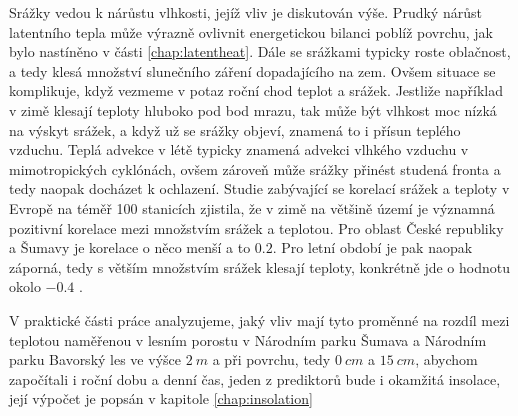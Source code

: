 
Srážky vedou k nárůstu vlhkosti, jejíž vliv je diskutován výše. Prudký nárůst latentního tepla může výrazně ovlivnit energetickou bilanci poblíž povrchu, jak bylo nastíněno v části \ref{chap:latentheat}. Dále se srážkami typicky roste oblačnost, a tedy klesá množství slunečního záření dopadajícího na zem. Ovšem situace se komplikuje, když vezmeme v potaz roční chod teplot a srážek. Jestliže například v zimě klesají teploty hluboko pod bod mrazu, tak může být vlhkost moc nízká na výskyt srážek, a když už se srážky objeví, znamená to i přísun teplého vzduchu. Teplá advekce v létě typicky znamená advekci vlhkého vzduchu v mimotropických cyklónách, ovšem zároveň může srážky přinést studená fronta a tedy naopak docházet k ochlazení. Studie zabývající se korelací srážek a teploty v Evropě na téměř 100 stanicích zjistila, že v zimě na většině území je významná pozitivní korelace mezi množstvím srážek a teplotou. Pro oblast České republiky a Šumavy je korelace o něco menší a to $0.2$. Pro letní období je pak naopak záporná, tedy s větším množstvím srážek klesají teploty, konkrétně jde o hodnotu okolo $-0.4$ \parencite{maddenroland1978}.

V praktické části práce analyzujeme, jaký vliv mají tyto proměnné na rozdíl mezi teplotou naměřenou v lesním porostu v Národním parku Šumava a Národním parku Bavorský les ve výšce $\SI{2}{m}$ a při povrchu, tedy $\SI{0}{cm}$ a $\SI{15}{cm}$, abychom započítali i roční dobu a denní čas, jeden z prediktorů bude i okamžitá insolace, její výpočet je popsán v kapitole \ref{chap:insolation}

